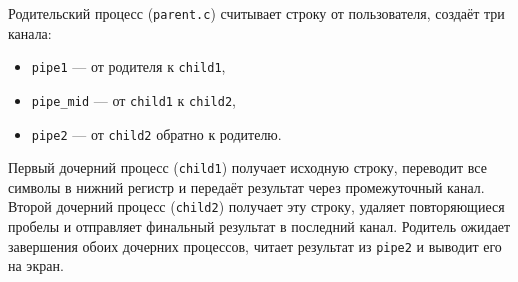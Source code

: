 Родительский процесс (\texttt{parent.c}) считывает строку от пользователя, создаёт три канала:  
\begin{itemize}
    \item \texttt{pipe1} — от родителя к \texttt{child1},
    \item \texttt{pipe\_mid} — от \texttt{child1} к \texttt{child2},
    \item \texttt{pipe2} — от \texttt{child2} обратно к родителю.
\end{itemize}
Первый дочерний процесс (\texttt{child1}) получает исходную строку, переводит все символы в нижний регистр и передаёт результат через промежуточный канал.  
Второй дочерний процесс (\texttt{child2}) получает эту строку, удаляет повторяющиеся пробелы и отправляет финальный результат в последний канал.  
Родитель ожидает завершения обоих дочерних процессов, читает результат из \texttt{pipe2} и выводит его на экран.
